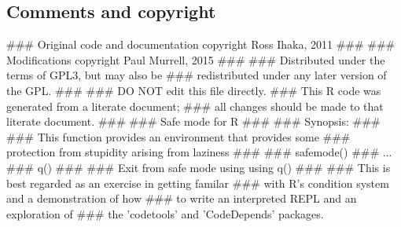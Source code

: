 \documentclass[a4paper]{article}%
\begin{document}
\subsection{Comments and copyright}
\label{sec:comments-and-copyright}

\nwenddocs{}\endmoddef\let\nwnotused=\nwoutput{}\nwstartdeflinemarkup{}\nwenddeflinemarkup
###  Original code and documentation copyright Ross Ihaka, 2011
### 
###  Modifications copyright Paul Murrell, 2015
###
###  Distributed under the terms of GPL3, but may also be
###  redistributed under any later version of the GPL.
###
###  DO NOT edit this file directly.
###  This R code was generated from a literate document;
###  all changes should be made to that literate document.
###
###  Safe mode for R
###
###  Synopsis:
###
###  This function provides an environment that provides some 
###  protection from stupidity arising from laziness
###
###    safemode()
###    ...
###    q()
###
###  Exit from safe mode using using q()
###
###  This is best regarded as an exercise in getting familar
###  with R's condition system and a demonstration of how
###  to write an interpreted REPL and an exploration of 
###  the 'codetools' and 'CodeDepends' packages.

\nwendcode{}
\end{document}
